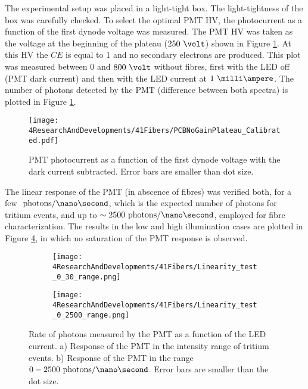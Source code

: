 The experimental setup was placed in a light-tight box. The light-tightness of the box was carefully checked. To select the optimal PMT HV, the photocurrent as a function of the first dynode voltage was measured. The PMT HV was taken as the voltage at the beginning of the plateau ($250~\volt$) shown in Figure \ref{fig:PlateauNoGainPMT}. At this HV the $CE$ is equal to 1 and no secondary electrons are produced. This plot was measured between $0$ and $800~\volt$ without fibres, first with the LED off (PMT dark current) and then with the LED current at $1~\milli\ampere$. The number of photons detected by the PMT (difference between both spectra) is plotted in Figure \ref{fig:PlateauNoGainPMT}. 

\begin{figure}[h]
\centering
\texttt{[image: 4ResearchAndDevelopments/41Fibers/PCBNoGainPlateau\_Calibrated.pdf]}
\caption{PMT photocurrent as a function of the first dynode voltage with the dark current subtracted. Error bars are smaller than dot size.\label{fig:PlateauNoGainPMT}}
\end{figure}

The linear response of the PMT (in abscence of fibres) was verified both, for a few $~\text{photons}/\nano\second$, which is the expected number of photons for tritium events, and up to $\sim 2500~\text{photons}/\nano\second$, employed for fibre characterization. The results in the low and high illumination cases are plotted in Figure \ref{fig:LinearityRangesOfPMT}, in which no saturation of the PMT response is observed.

\begin{figure}
\centering
    \begin{subfigure}[b]{1\textwidth}
    \centering
    \texttt{[image: 4ResearchAndDevelopments/41Fibers/Linearity\_test\_0\_30\_range.png]}  
    \caption{\label{subfig:LinearityTritiumRange}}
    \end{subfigure}
    \hfill
    \begin{subfigure}[b]{1\textwidth}
    \centering
    \texttt{[image: 4ResearchAndDevelopments/41Fibers/Linearity\_test\_0\_2500\_range.png]}  
    \caption{\label{subfig:LinearityStudyRange}}
    \end{subfigure}
 \caption{Rate of photons measured by the PMT as a function of the LED current. a) Response of the PMT in the intensity range of tritium events. b) Response of the PMT in the range $0-2500~\text{photons}/\nano\second$. Error bars are smaller than the dot size.}
 \label{fig:LinearityRangesOfPMT}
\end{figure}